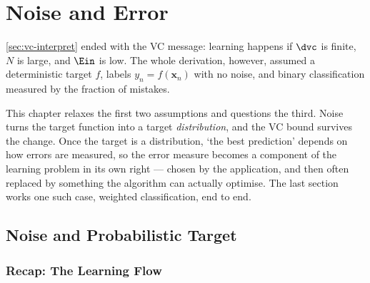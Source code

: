 \chapter{Noise and Error}

\begin{prev}
    \autoref{sec:vc-interpret} ended with the VC message: learning happens if
    \(\dvc\) is finite, \(N\) is large, and \(\Ein\) is low. The whole
    derivation, however, assumed a deterministic target \(f\), labels
    \(y_n = f(\bm{x}_n)\) with no noise, and binary classification measured by
    the fraction of mistakes.
\end{prev}

This chapter relaxes the first two assumptions and questions the third. Noise
turns the target function into a target \emph{distribution}, and the VC bound
survives the change. Once the target is a distribution, `the best prediction'
depends on how errors are measured, so the error measure becomes a component of
the learning problem in its own right --- chosen by the application, and then
often replaced by something the algorithm can actually optimise. The last
section works one such case, weighted classification, end to end.

\section{Noise and Probabilistic Target}\label{sec:noise}


\subsection{Recap: The Learning Flow}

